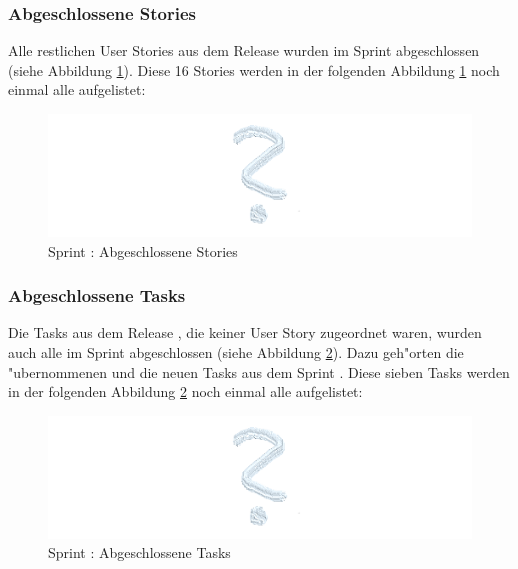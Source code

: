 \documentclass[12pt, titlepage]{scrartcl}
\newcommand{\RN}[1]{%
	\textup{\uppercase\expandafter{\romannumeral#1}}%
}
\begin{document}
	    	\subsubsection{Abgeschlossene Stories}
	    		Alle restlichen User Stories aus dem Release \RN{3} wurden im Sprint \RN{5} abgeschlossen (siehe Abbildung \ref{Done_Stories_6}). Diese 16 Stories werden in der folgenden Abbildung \ref{Done_Stories_6} noch einmal alle aufgelistet:
	    		\begin{figure}[H]
	    			\centering
	    			\includegraphics[width=\textwidth]{images/sprintVI/doneStories.png}
	    			\caption{Sprint \RN{6}: Abgeschlossene Stories}
	    			\label{Done_Stories_6}
	    		\end{figure}
    		\subsubsection{Abgeschlossene Tasks}
    			Die Tasks aus dem Release \RN{3}, die keiner User Story zugeordnet waren, wurden auch alle im Sprint \RN{5} abgeschlossen (siehe Abbildung \ref{Done_Tasks_6}). Dazu geh"orten die "ubernommenen und die neuen Tasks aus dem Sprint \RN{6}. Diese sieben Tasks werden in der folgenden Abbildung \ref{Done_Tasks_6} noch einmal alle aufgelistet:
    			\begin{figure}[H]
    				\centering
    				\includegraphics[width=\textwidth]{images/sprintVI/doneTasks.png}
    				\caption{Sprint \RN{6}: Abgeschlossene Tasks}
    				\label{Done_Tasks_6}
    			\end{figure}
\end{document}
